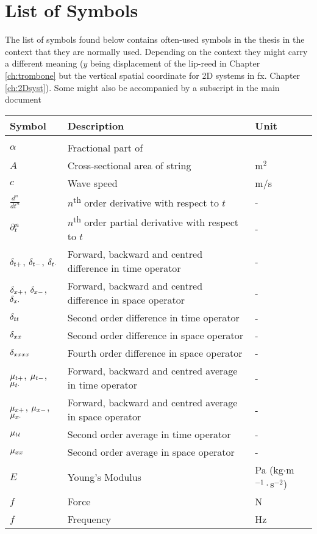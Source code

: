 \chapter*{List of Symbols}\label{app:listOfSymbols}
The list of symbols found below contains often-used symbols in the thesis in the context that they are normally used. Depending on the context they might carry a different meaning ($y$ being displacement of the lip-reed in Chapter \ref{ch:trombone} but the vertical spatial coordinate for 2D systems in fx. Chapter \ref{ch:2Dsyst}). Some might also be accompanied by a subscript in the main document

{\centering\renewcommand{\arraystretch}{1.1}
\begin{longtable}{ p{2cm} p{6.5cm} p{2.5cm}  }
 Symbol & Description & Unit\\
 \hline\\
 \endhead
 $\alpha$ & Fractional part of & \\
 $A$ & Cross-sectional area of string & m$^2$\\
 $c$ & Wave speed & m/s\\
 $\frac{d^n}{dt^n}$ & $n$\textsuperscript{th} order derivative with respect to $t$ & - \\
 $\partial_t^n$ & $n$\textsuperscript{th} order partial derivative with respect to $t$ & - \\
 $\delta_{t+}$, $\delta_{t-}$, $\delta_{t\cdot}$ & Forward, backward and centred difference in time operator & - \\
 $\delta_{x+}$, $\delta_{x-}$, $\delta_{x\cdot}$ & Forward, backward and centred difference in space operator& - \\
 $\delta_{tt}$& Second order difference in time operator& - \\
 $\delta_{xx}$& Second order difference in space operator& - \\
 $\delta_{xxxx}$& Fourth order difference in space operator& - \\
 $\mu_{t+}$, $\mu_{t-}$, $\mu_{t\cdot}$ & Forward, backward and centred average in time operator& - \\
 $\mu_{x+}$, $\mu_{x-}$, $\mu_{x\cdot}$ & Forward, backward and centred average in space operator& - \\
 $\mu_{tt}$ & Second order average in time operator& -\\
 $\mu_{xx}$ & Second order average in space operator& -\\
 $E$ & Young's Modulus & Pa (kg$\cdot$m$^{-1}\cdot$s$^{-2}$)\\
 $f$ & Force & N\\
 $f$ & Frequency & Hz\\

\end{longtable}}
